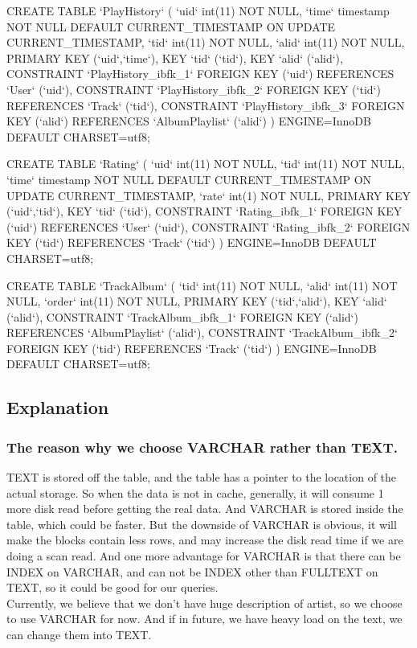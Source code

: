 \documentclass[letter, 12pt]{report}
\begin{document}
\begin{spverbatim}
	CREATE TABLE `PlayHistory` (
	`uid` int(11) NOT NULL,
	`time` timestamp NOT NULL DEFAULT CURRENT_TIMESTAMP ON UPDATE CURRENT_TIMESTAMP,
	`tid` int(11) NOT NULL,
	`alid` int(11) NOT NULL,
	PRIMARY KEY (`uid`,`time`),
	KEY `tid` (`tid`),
	KEY `alid` (`alid`),
	CONSTRAINT `PlayHistory_ibfk_1` FOREIGN KEY (`uid`) REFERENCES `User` (`uid`),
	CONSTRAINT `PlayHistory_ibfk_2` FOREIGN KEY (`tid`) REFERENCES `Track` (`tid`),
	CONSTRAINT `PlayHistory_ibfk_3` FOREIGN KEY (`alid`) REFERENCES `AlbumPlaylist` (`alid`)
	) ENGINE=InnoDB DEFAULT CHARSET=utf8;
	
	CREATE TABLE `Rating` (
	`uid` int(11) NOT NULL,
	`tid` int(11) NOT NULL,
	`time` timestamp NOT NULL DEFAULT CURRENT_TIMESTAMP ON UPDATE CURRENT_TIMESTAMP,
	`rate` int(1) NOT NULL,
	PRIMARY KEY (`uid`,`tid`),
	KEY `tid` (`tid`),
	CONSTRAINT `Rating_ibfk_1` FOREIGN KEY (`uid`) REFERENCES `User` (`uid`),
	CONSTRAINT `Rating_ibfk_2` FOREIGN KEY (`tid`) REFERENCES `Track` (`tid`)
	) ENGINE=InnoDB DEFAULT CHARSET=utf8;
	
	CREATE TABLE `TrackAlbum` (
	`tid` int(11) NOT NULL,
	`alid` int(11) NOT NULL,
	`order` int(11) NOT NULL,
	PRIMARY KEY (`tid`,`alid`),
	KEY `alid` (`alid`),
	CONSTRAINT `TrackAlbum_ibfk_1` FOREIGN KEY (`alid`) REFERENCES `AlbumPlaylist` (`alid`),
	CONSTRAINT `TrackAlbum_ibfk_2` FOREIGN KEY (`tid`) REFERENCES `Track` (`tid`)
	) ENGINE=InnoDB DEFAULT CHARSET=utf8;
	\end{spverbatim}
	\subsection{Explanation}
	\subsubsection{The reason why we choose VARCHAR rather than TEXT.}
	TEXT is stored off the table, and the table has a pointer to the location of the actual storage. So when the data is not in cache, generally, it will consume 1 more disk read before getting the real data. And VARCHAR is stored inside the table, which could be faster. But the downside of VARCHAR is obvious, it will make the blocks contain less rows, and may increase the disk read time if we are doing a scan read. And one more advantage for VARCHAR is that there can be INDEX on VARCHAR, and can not be INDEX other than FULLTEXT on TEXT, so it could be good for our queries.\\
	Currently, we believe that we don't have huge description of artist, so we choose to use VARCHAR for now. And if in future, we have heavy load on the text, we can change them into TEXT.
	
\end{document}

